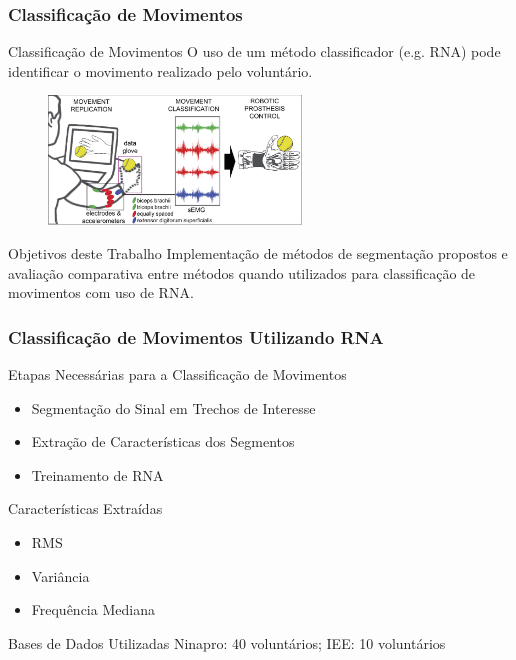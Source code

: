 \documentclass{beamer}
\begin{document}
	\begin{frame}
		\frametitle{Classificação de Movimentos}
		
		\begin{exampleblock}{Classificação de Movimentos}
			O uso de um método classificador (e.g. RNA) pode identificar o movimento realizado pelo voluntário.
		\end{exampleblock}
		
		\begin{figure}
			\begin{center}
				\includegraphics[width=0.6\textwidth]{./img/classificationExample.jpg}
			\end{center}
		\end{figure}
		
		\begin{block}{Objetivos deste Trabalho}
			Implementação de métodos de segmentação propostos e avaliação comparativa entre métodos quando utilizados para classificação de movimentos com uso de RNA.
		\end{block}
		
	\end{frame}
	
	\begin{frame}
		\frametitle{Classificação de Movimentos Utilizando RNA}

		\begin{alertblock}{Etapas Necessárias para a Classificação de Movimentos}
		\begin{itemize}
			\item Segmentação do Sinal em Trechos de Interesse
			\item Extração de Características dos Segmentos
			\item Treinamento de RNA
		\end{itemize}
		\end{alertblock}
		
		\begin{exampleblock}{Características Extraídas}
		\begin{itemize}
			\item RMS
			\item Variância
			\item Frequência Mediana
		\end{itemize}
		\end{exampleblock}
		
		\begin{block}{Bases de Dados Utilizadas}
			Ninapro: 40 voluntários; IEE: 10 voluntários
		\end{block}
		
	\end{frame}
\end{document}
